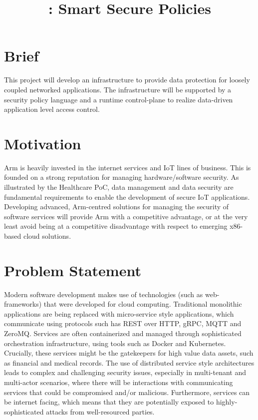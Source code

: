 \documentclass[a4paper]{article}
\title{\armour{}: Smart Secure Policies}
\date{}
\begin{document}
\maketitle

\section{Brief}

This project will develop an infrastructure to provide data protection
for loosely coupled networked applications.
%
The infrastructure will be supported by a security policy language and
a runtime control-plane to realize data-driven application level
access control.

\section{Motivation}

Arm is heavily invested in the internet services and IoT lines of
business.
%
This is founded on a strong reputation for managing hardware/software
security.
%
As illustrated by the Healthcare PoC, data management and data
security are fundamental requirements to enable the development of
secure IoT applications.
%
Developing advanced, Arm-centred solutions for managing the security
of software services will provide Arm with a competitive advantage, or
at the very least avoid being at a competitive disadvantage with
respect to emerging x86-based cloud solutions.


\section{Problem Statement}

Modern software development makes use of technologies (such as
web-frameworks) that were developed for cloud computing.
%
Traditional monolithic applications are being replaced with
micro-service style applications, which communicate using protocols
such has REST over HTTP, gRPC, MQTT and ZeroMQ.
%
Services are often containerized and managed through sophisticated
orchestration infrastructure, using tools such as Docker and
Kubernetes.
%
Crucially, these services might be the gatekeepers for high value data
assets, such as financial and medical records.
%
The use of distributed service style architectures leads to complex
and challenging security issues, especially in multi-tenant and
multi-actor scenarios, where there will be interactions with
communicating services that could be compromised and/or malicious.
%
Furthermore, services can be internet facing, which means that they
are potentially exposed to highly-sophisticated attacks from
well-resourced parties.
\end{document}
